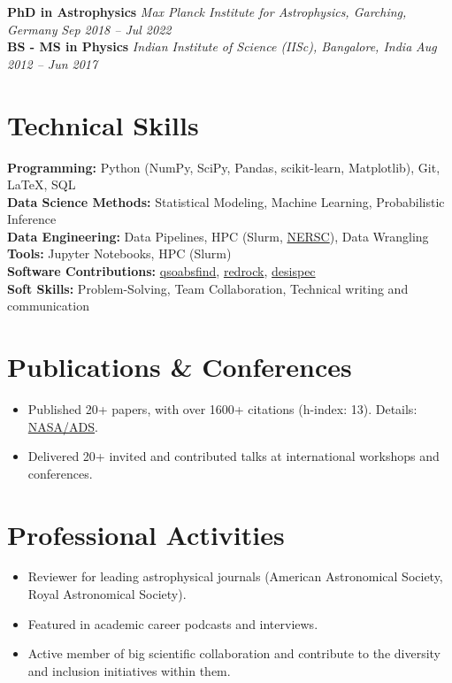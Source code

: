 \documentclass[a4paper,10pt]{article}
\begin{document}
\textbf{PhD in Astrophysics} \hfill \textit{Max Planck Institute for Astrophysics, Garching, Germany} \hfill \textit{Sep 2018 – Jul 2022}\\
\textbf{BS - MS in Physics} \hfill \textit{Indian Institute of Science (IISc), Bangalore, India} \hfill \textit{Aug 2012 – Jun 2017}
\vspace*{-2mm}
\section*{Technical Skills}
\textbf{Programming:} Python (NumPy, SciPy, Pandas, scikit-learn, Matplotlib), Git, LaTeX, SQL \\
\textbf{Data Science Methods:} Statistical Modeling, Machine Learning, Probabilistic Inference\\
\textbf{Data Engineering:} Data Pipelines, HPC (Slurm, \href{https://www.nersc.gov}{NERSC}), Data Wrangling\\
\textbf{Tools:} Jupyter Notebooks, HPC (Slurm)\\
\textbf{Software Contributions:} \href{https://github.com/abhi0395/qsoabsfind}{qsoabsfind}, \href{https://github.com/desihub/redrock}{redrock}, \href{https://github.com/desihub/desispec}{desispec}\\
\textbf{Soft Skills:} Problem-Solving, Team Collaboration, Technical writing and communication
\vspace*{-2mm}
\section*{Publications \& Conferences}
\begin{itemize}
    \item Published 20+ papers, with over 1600+ citations (h-index: 13). Details: \href{https://ui.adsabs.harvard.edu/public-libraries/YPXGQEsNQg-zR9R9YBYFXw}{NASA/ADS}.
    \item Delivered 20+ invited and contributed talks at international workshops and conferences.
\end{itemize}
\vspace*{-3mm}
\section*{Professional Activities}
\begin{itemize}
    \item Reviewer for leading astrophysical journals (American Astronomical Society, Royal Astronomical Society).
    \item Featured in academic career podcasts and interviews.
    \item Active member of big scientific collaboration and contribute to the diversity and inclusion initiatives within them.
\end{itemize}
\end{document}
